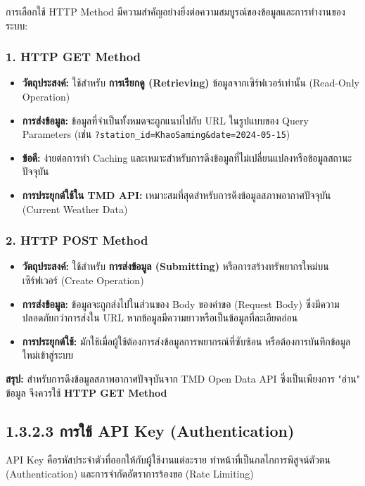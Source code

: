 \documentclass[11pt,a4paper,openany]{report}
\begin{document}
การเลือกใช้ HTTP Method มีความสำคัญอย่างยิ่งต่อความสมบูรณ์ของข้อมูลและการทำงานของระบบ:

\subsubsection{1. HTTP GET Method}

\begin{itemize}
  \item \textbf{วัตถุประสงค์:} ใช้สำหรับ \textbf{การเรียกดู (Retrieving)} ข้อมูลจากเซิร์ฟเวอร์เท่านั้น (Read-Only Operation)
  \item \textbf{การส่งข้อมูล:} ข้อมูลที่จำเป็นทั้งหมดจะถูกแนบไปกับ URL ในรูปแบบของ Query Parameters (เช่น \texttt{?station\_id=KhaoSaming\&date=2024-05-15})
  \item \textbf{ข้อดี:} ง่ายต่อการทำ Caching และเหมาะสำหรับการดึงข้อมูลที่ไม่เปลี่ยนแปลงหรือข้อมูลสถานะปัจจุบัน
  \item \textbf{การประยุกต์ใช้ใน TMD API:} เหมาะสมที่สุดสำหรับการดึงข้อมูลสภาพอากาศปัจจุบัน (Current Weather Data)
\end{itemize}


\subsubsection{2. HTTP POST Method}

\begin{itemize}
  \item \textbf{วัตถุประสงค์:} ใช้สำหรับ \textbf{การส่งข้อมูล (Submitting)} หรือการสร้างทรัพยากรใหม่บนเซิร์ฟเวอร์ (Create Operation)
  \item \textbf{การส่งข้อมูล:} ข้อมูลจะถูกส่งไปในส่วนของ Body ของคำขอ (Request Body) ซึ่งมีความปลอดภัยกว่าการส่งใน URL หากข้อมูลมีความยาวหรือเป็นข้อมูลที่ละเอียดอ่อน
  \item \textbf{การประยุกต์ใช้:} มักใช้เมื่อผู้ใช้ต้องการส่งข้อมูลการพยากรณ์ที่ซับซ้อน หรือต้องการบันทึกข้อมูลใหม่เข้าสู่ระบบ
\end{itemize}


\textbf{สรุป:} สำหรับการดึงข้อมูลสภาพอากาศปัจจุบันจาก TMD Open Data API ซึ่งเป็นเพียงการ "อ่าน" ข้อมูล จึงควรใช้ \textbf{HTTP GET Method}

\subsection{1.3.2.3 การใช้ API Key (Authentication)}


API Key คือรหัสประจำตัวที่ออกให้กับผู้ใช้งานแต่ละราย ทำหน้าที่เป็นกลไกการพิสูจน์ตัวตน (Authentication) และการจำกัดอัตราการร้องขอ (Rate Limiting)
\end{document}
